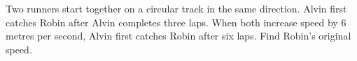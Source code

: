 Two runners start together on a circular track in the same direction. Alvin first catches Robin after Alvin completes three laps. When both increase speed by $6$ metres per second, Alvin first catches Robin after six laps. Find Robin's original speed.

